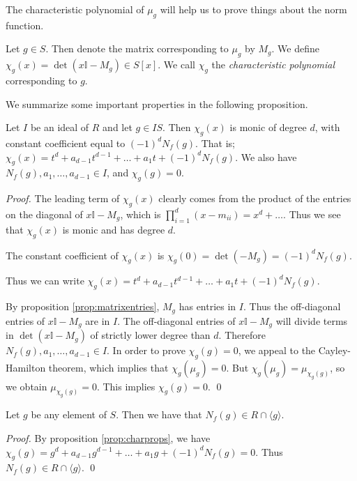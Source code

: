 The characteristic polynomial of $\mu_g$ will help us to prove things about the norm function.

\begin{definition}
  Let $g \in S$.
  Then denote the matrix corresponding to $\mu_g$ by $M_g$.
  We define $\chi_g (x) = \det (x \mathbb I - M_g) \in S[x]$.
  We call $\chi_g$ the \emph{characteristic polynomial} corresponding to $g$.
\end{definition}

We summarize some important properties in the following proposition.

\begin{proposition}
\label{prop:charprops}
  Let $I$ be an ideal of $R$ and let $g \in IS$.
  Then $\chi_g(x)$ is monic of degree $d$, with constant coefficient equal to $(-1)^d N_f(g)$.
  That is; $\chi_g(x) = t^d + a_{d-1}t^{d-1} + \dots + a_1 t + (-1)^d N_f(g)$.
  We also have $N_f(g), a_1, \dots, a_{d-1} \in I$, and $\chi_g(g) = 0$.
\end{proposition}
\begin{proof}
    The leading term of $\chi_g(x)$ clearly comes from the product of the
    entries on the diagonal of $x \mathbb I - M_g$, which is $\prod_{i=1}^d (x - m_{ii}) = x^d + \dots$.
    Thus we see that $\chi_g(x)$ is monic and has degree $d$.

    The constant coefficient of $\chi_g(x)$ is $\chi_g(0) = \det (-M_g) = (-1)^d N_f(g)$.

    Thus we can write $\chi_g(x) = t^d + a_{d-1}t^{d-1} + \dots + a_1 t + (-1)^d N_f(g)$.
    
    By proposition \ref{prop:matrixentries}, $M_g$ has entries in $I$.
    Thus the off-diagonal entries  of $x \mathbb I - M_g$ are in $I$.
    The off-diagonal entries of $x \mathbb I - M_g$ will divide terms in $\det (x \mathbb I - M_g)$ of strictly lower degree than $d$.
    Therefore $N_f(g), a_1, \dots, a_{d-1} \in I$.
    In order to prove $\chi_g(g) = 0$, we appeal to the Cayley-Hamilton theorem, which implies that $\chi_g(\mu_g) = 0$.
    But $\chi_g(\mu_g) = \mu_{\chi_g(g)}$, so we obtain $\mu_{\chi_g(g)} = 0$.
    This implies $\chi_g(g) = 0$.
    \qed
\end{proof}

\begin{proposition}
\label{prop:normprop}
  Let $g$ be any element of $S$.
  Then we have that $N_f(g) \in R \cap \langle g \rangle$.
\end{proposition}
\begin{proof}
  By proposition \ref{prop:charprops}, we have $\chi_g(g) = g^d + a_{d-1} g^{d-1} + \dots + a_1 g + (-1)^d N_f(g) = 0$.
  Thus $N_f(g) \in R \cap \langle g \rangle$.
  \qed
\end{proof}

